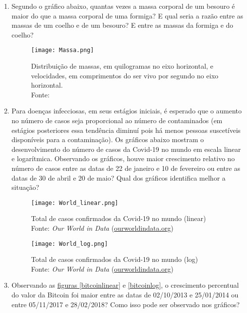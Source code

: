\begin{enumerate}

\item \label{Exer1} Segundo o gráfico abaixo, quantas vezes a massa corporal de um besouro é maior do que a massa corporal de uma formiga? E qual seria a razão entre as massas de um coelho e de um besouro? E entre as massas da formiga e do coelho?

\begin{figure}[H]
\centering

\texttt{[image: Massa.png]}
\caption{{Distribuição de massas, em quilogramas no eixo horizontal, e velocidades, em comprimentos do ser vivo por segundo no eixo horizontal.} \\ Fonte: \cite{Mayer15}
}
\end{figure}


\item \label{Exer2}\label{Covid19Exer} Para doenças infecciosas, em seus estágios iniciais, é esperado que o aumento no número de casos seja proporcional ao número de contaminados (em estágios posteriores essa tendência diminuí pois há menos pessoas suscetíveis disponíveis para a contaminação). Os gráficos abaixo mostram o desenvolvimento  do número de casos da Covid-19 no mundo em escala linear e logarítmica. Observando os gráficos, houve maior crescimento relativo no número de casos entre as datas de 22 de janeiro e 10 de fevereiro ou entre as datas de 30 de abril e 20 de maio? Qual dos gráficos identifica melhor a situação?

\begin{figure}[H]
\centering

\texttt{[image: World\_linear.png]}
\caption{Total de casos confirmados da Covid-19 no mundo (linear)\\
Fonte: \textit{Our World in Data} (\url{ourworldindata.org})}
\end{figure}

\begin{figure}[H]
\centering

\texttt{[image: World\_log.png]}
\caption{Total de casos confirmados da Covid-19 no mundo (log)\\
Fonte: \textit{Our World in Data} (\url{ourworldindata.org})}
\end{figure}


\item \label{Exer3} Observando as \hyperref[bitcoinlinear]{figuras \ref{bitcoinlinear}} e \ref{bitcoinlog}, o crescimento percentual do valor da Bitcoin foi maior entre as datas de 02/10/2013 e 25/01/2014 ou entre 05/11/2017 e 28/02/2018? Como isso pode ser observado nos gráficos?



\end{enumerate}

